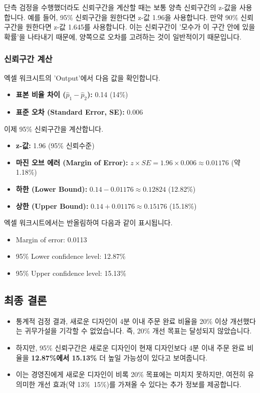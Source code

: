 \documentclass[11pt,a4paper]{article}
\theoremstyle{definition}
\begin{document}
\begin{cautionbox}[title=z-값 선택의 혼동 방지:]
단측 검정을 수행했더라도 신뢰구간을 계산할 때는 보통 양측 신뢰구간의 z-값을 사용합니다. 예를 들어, 95\% 신뢰구간을 원한다면 z-값 1.96을 사용합니다. 만약 90\% 신뢰구간을 원한다면 z-값 1.645를 사용합니다. 이는 신뢰구간이 '모수가 이 구간 안에 있을 확률'을 나타내기 때문에, 양쪽으로 오차를 고려하는 것이 일반적이기 때문입니다.
\end{cautionbox}

\subsubsection{신뢰구간 계산}
엑셀 워크시트의 'Output'에서 다음 값을 확인합니다.
\begin{itemize}
    \item \textbf{표본 비율 차이 ($\hat{p}_1 - \hat{p}_2$):} 0.14 (14\%)
    \item \textbf{표준 오차 (Standard Error, SE):} 0.006
\end{itemize}
이제 95\% 신뢰구간을 계산합니다.
\begin{itemize}
    \item \textbf{z-값:} 1.96 (95\% 신뢰수준)
    \item \textbf{마진 오브 에러 (Margin of Error):} $z \times SE = 1.96 \times 0.006 \approx 0.01176$ (약 1.18\%)
    \item \textbf{하한 (Lower Bound):} $0.14 - 0.01176 \approx 0.12824$ (12.82\%)
    \item \textbf{상한 (Upper Bound):} $0.14 + 0.01176 \approx 0.15176$ (15.18\%)
\end{itemize}
엑셀 워크시트에서는 반올림하여 다음과 같이 표시됩니다.
\begin{itemize}
    \item Margin of error: 0.0113
    \item 95\% Lower confidence level: 12.87\%
    \item 95\% Upper confidence level: 15.13\%
\end{itemize}

\subsection{최종 결론}

\begin{summarybox}[title=종합 결론:]
\begin{itemize}
    \item 통계적 검정 결과, 새로운 디자인이 4분 이내 주문 완료 비율을 20\% 이상 개선했다는 귀무가설을 기각할 수 없었습니다. 즉, 20\% 개선 목표는 달성되지 않았습니다.
    \item 하지만, 95\% 신뢰구간은 새로운 디자인이 현재 디자인보다 4분 이내 주문 완료 비율을 \textbf{12.87\%에서 15.13\%} 더 높일 가능성이 있다고 보여줍니다.
    \item 이는 경영진에게 새로운 디자인이 비록 20\% 목표에는 미치지 못하지만, 여전히 유의미한 개선 효과(약 13\%~15\%)를 가져올 수 있다는 추가 정보를 제공합니다.
\end{itemize}
\end{summarybox}
\end{document}
